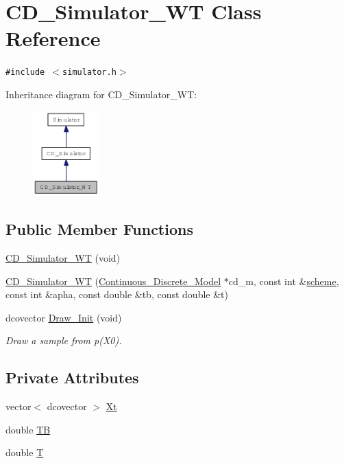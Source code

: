 \hypertarget{class_c_d___simulator___w_t}{
\section{CD\_\-Simulator\_\-WT Class Reference}
\label{class_c_d___simulator___w_t}
}
{\tt \#include $<$simulator.h$>$}

Inheritance diagram for CD\_\-Simulator\_\-WT:\nopagebreak
\begin{figure}[H]
\begin{center}
\leavevmode
\includegraphics[width=73pt]{class_c_d___simulator___w_t__inherit__graph}
\end{center}
\end{figure}
\subsection*{Public Member Functions}
\begin{CompactItemize}
\item 
\hyperlink{class_c_d___simulator___w_t_83cf1b0723ca06211116b0478fa078b2}{CD\_\-Simulator\_\-WT} (void)
\item 
\hyperlink{class_c_d___simulator___w_t_173ec7213417756a63b91f9a7f3d18fd}{CD\_\-Simulator\_\-WT} (\hyperlink{class_continuous___discrete___model}{Continuous\_\-Discrete\_\-Model} $\ast$cd\_\-m, const int \&\hyperlink{class_c_d___simulator_a19045bbd5c743d900780338ab355035}{scheme}, const int \&apha, const double \&tb, const double \&t)
\item 
dcovector \hyperlink{class_c_d___simulator___w_t_c05069bbef8e4ff83247f77476b2afe1}{Draw\_\-Init} (void)
\begin{CompactList}\small\item\em Draw a sample from p(X0). \item\end{CompactList}\end{CompactItemize}
\subsection*{Private Attributes}
\begin{CompactItemize}
\item 
vector$<$ dcovector $>$ \hyperlink{class_c_d___simulator___w_t_eec47eb023c17590e9d1d89af874f1bc}{Xt}
\item 
double \hyperlink{class_c_d___simulator___w_t_5683b0d07bcb3f4f990ae261bb372487}{TB}
\item 
double \hyperlink{class_c_d___simulator___w_t_f6bede78aad1b7d023d5b139172a4103}{T}
\end{CompactItemize}


